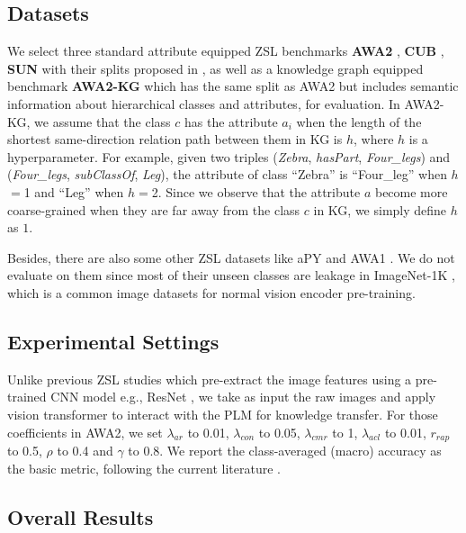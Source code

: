 \documentclass[letterpaper]{article} \usepackage{aaai23}  \usepackage{times}  \usepackage{helvet}  \usepackage{courier}  \usepackage[hyphens]{url}  \usepackage{graphicx} \urlstyle{rm} \def\UrlFont{\rm}  \usepackage{natbib}  \usepackage{caption} \frenchspacing  \setlength{\pdfpagewidth}{8.5in}  \setlength{\pdfpageheight}{11in}  \usepackage{algorithm}
\newcommand{\hyf}[1]{{\color{black}#1}}
\newcommand{\fy}[1]{{\color{black}#1}}
\newcommand{\jeff}[1]{{\color{black}#1}}
\begin{document}
\subsection{Datasets}

{We select three standard attribute equipped ZSL benchmarks \textbf{AWA2} \cite{DBLP:journals/pami/XianLSA19}, \textbf{CUB} \cite{welinder2010caltech}, \textbf{SUN} \cite{DBLP:conf/cvpr/PattersonH12} with their splits proposed in \cite{DBLP:journals/pami/XianLSA19}, as well as a knowledge graph equipped benchmark \textbf{AWA2-KG} which has the same split as AWA2 but includes semantic information about hierarchical classes and attributes, for evaluation. 
In AWA2-KG,}
we assume \fy{that} the class $c$ \fy{has} the attribute $a_i$ when the length of the shortest same-direction relation path between \fy{them} in KG is $h$, where $h$ is a hyperparameter. 
For example, given two triples (\textit{Zebra}, \textit{hasPart}, \textit{Four_legs}) and (\textit{Four_legs}, \textit{subClassOf}, \textit{Leg}), the attribute of class ``Zebra'' is ``Four\_leg'' when $h$$=$1 and ``Leg'' when $h$$=$2.
{\fy{Since we observe that the attribute $a$ become more coarse-grained when they are far away from the class $c$ in KG, we simply define $h$ as $1$.}}

Besides, there are also some other 
ZSL datasets like aPY \cite{DBLP:conf/cvpr/FarhadiEHF09} and AWA1 \cite{DBLP:journals/pami/LampertNH14}.  \jeff{We} do not evaluate on them since most of their unseen classes are leakage \cite{DBLP:journals/pami/XianLSA19}  in ImageNet-1K \cite{DBLP:conf/cvpr/DengDSLL009}, which is a common image datasets for normal vision encoder pre-training. 

\subsection{Experimental Settings}
Unlike previous ZSL studies which pre-extract the image features using a pre-trained CNN model e.g., ResNet \cite{DBLP:conf/cvpr/HeZRS16}, we take as input the raw images and apply vision transformer to 
interact with the PLM for knowledge transfer.
For those coefficients in AWA2, we set $\lambda_{ar}$ to \hyf{0.01}, $\lambda_{con}$ to \hyf{0.05}, $\lambda_{cmr}$ to \hyf{1}, $\lambda_{acl}$ to 0.01,  $r_{rap}$ to 0.5, $\rho$ to 0.4 and $\gamma$ to 0.8. 
{We report the class-averaged (macro) accuracy as the basic metric, following the current literature \cite{DBLP:conf/nips/XuXWSA20,Chen2021TransZero}.}

\subsection{Overall Results}
\end{document}
